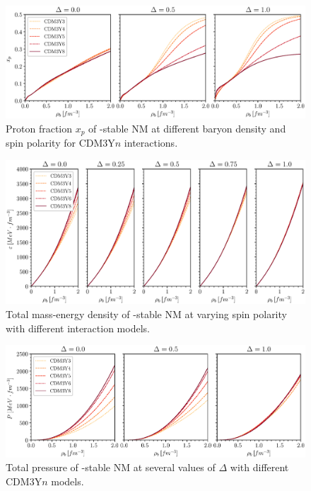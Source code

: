 \begin{figure}[ht!]
        \centering
        \includegraphics[width=\textwidth]{fig/xp.eps}
        \caption{Proton fraction $x_p$ of \textbeta-stable \gls{NM} at different baryon density and spin polarity for CDM3Y$n$ interactions.}
        \label{fig:xp}
\end{figure} 
\begin{figure}[ht!]
        \centering
        \includegraphics[width=\textwidth]{fig/E.eps}
        \caption{Total mass-energy density of \textbeta-stable \gls{NM} at varying spin polarity with different interaction models.}
        \label{fig:e}
\end{figure} 
\begin{figure}[ht!]
        \centering
        \includegraphics[width=\textwidth]{fig/P.eps}
        \caption{Total pressure of \textbeta-stable \gls{NM} at several values of $\Delta$ with different CDM3Y$n$ models.}
        \label{fig:p}
\end{figure} 

